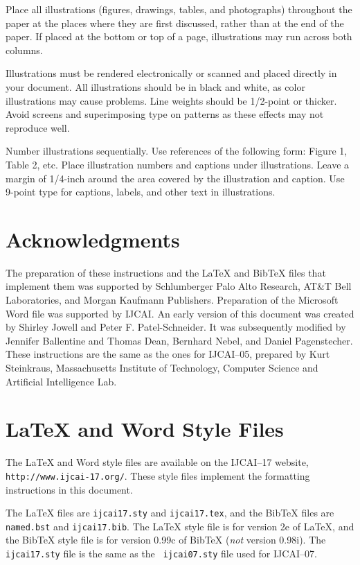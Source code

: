 \documentclass{article}
\begin{document}
Place all illustrations (figures, drawings, tables, and photographs)
throughout the paper at the places where they are first discussed,
rather than at the end of the paper. If placed at the bottom or top of
a page, illustrations may run across both columns.

Illustrations must be rendered electronically or scanned and placed
directly in your document. All illustrations should be in black and
white, as color illustrations may cause problems. Line weights should
be 1/2-point or thicker. Avoid screens and superimposing type on
patterns as these effects may not reproduce well.

Number illustrations sequentially. Use references of the following
form: Figure 1, Table 2, etc. Place illustration numbers and captions
under illustrations. Leave a margin of 1/4-inch around the area
covered by the illustration and caption.  Use 9-point type for
captions, labels, and other text in illustrations.

\section*{Acknowledgments}

The preparation of these instructions and the \LaTeX{} and Bib\TeX{}
files that implement them was supported by Schlumberger Palo Alto
Research, AT\&T Bell Laboratories, and Morgan Kaufmann Publishers.
Preparation of the Microsoft Word file was supported by IJCAI.  An
early version of this document was created by Shirley Jowell and Peter
F. Patel-Schneider.  It was subsequently modified by Jennifer
Ballentine and Thomas Dean, Bernhard Nebel, and Daniel Pagenstecher.
These instructions are the same as the ones for IJCAI--05, prepared by
Kurt Steinkraus, Massachusetts Institute of Technology, Computer
Science and Artificial Intelligence Lab.

\appendix

\section{\LaTeX{} and Word Style Files}\label{stylefiles}

The \LaTeX{} and Word style files are available on the IJCAI--17
website, {\tt http://www.ijcai-17.org/}.
These style files implement the formatting instructions in this
document.

The \LaTeX{} files are {\tt ijcai17.sty} and {\tt ijcai17.tex}, and
the Bib\TeX{} files are {\tt named.bst} and {\tt ijcai17.bib}. The
\LaTeX{} style file is for version 2e of \LaTeX{}, and the Bib\TeX{}
style file is for version 0.99c of Bib\TeX{} ({\em not} version
0.98i). The {\tt ijcai17.sty} file is the same as the {\tt
ijcai07.sty} file used for IJCAI--07.
\end{document}
